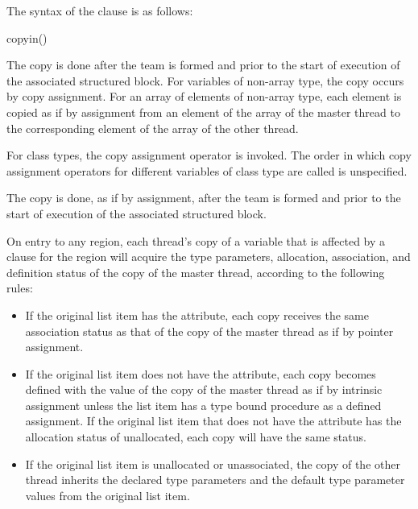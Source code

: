 \syntax
The syntax of the  clause is as follows:

\begin{ompSyntax}
copyin()
\end{ompSyntax}

\descr
\begin{ccppspecific}
The copy is done after the team is formed and prior to the start of execution of the
associated structured block. For variables of non-array type, the copy occurs by copy
assignment. For an array of elements of non-array type, each element is copied as if by
assignment from an element of the array of the master thread to the corresponding 
element of the array of the other thread.
\end{ccppspecific}

\begin{cppspecific}
For class types, the copy assignment operator is invoked. The order in which copy
assignment operators for different variables of class type are called is unspecified.
\end{cppspecific}

\begin{fortranspecific}
The copy is done, as if by assignment, after the team is formed and prior to 
the start of execution of the associated structured block.

On entry to any  region, each thread's copy of a variable that 
is affected by a  clause for the  region will acquire 
the type parameters, allocation, association, and definition status of the copy
of the master thread, according to the following rules:

\begin{itemize}
\item If the original list item has the  attribute, each copy 
      receives the same association status as that of the copy of the master 
      thread as if by pointer assignment.
\item If the original list item does not have the 
      attribute, each copy becomes defined with the value of the copy of
      the master thread as if by intrinsic assignment unless the list item has
      a type bound procedure as a defined assignment.  If the original
      list item that does not have the  attribute has the
      allocation status of unallocated, each copy will have the same status.
\item If the original list item is unallocated or unassociated, the copy of
      the other thread inherits the declared type parameters and the default 
      type parameter values from the original list item.
\end{itemize}
\end{fortranspecific}

